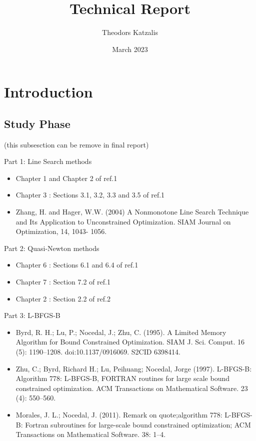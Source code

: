 \documentclass[a4paper,11pt]{article}
\title{Technical Report}
\author{Theodors Katzalis}
\date{March 2023}
\numberwithin{equation}{section} %
\begin{document}
\maketitle

\tableofcontents
\newpage

\section{Introduction}
\label{intro}

\subsection{Study Phase} (this subsesction can be remove in final report)

Part 1: Line Search methods

\begin{itemize}
\item Chapter 1 and Chapter 2 of ref.1
\item Chapter 3 : Sections 3.1, 3.2, 3.3 and 3.5 of ref.1
\item Zhang, H. and Hager, W.W. (2004) A Nonmonotone Line Search Technique and Its Application to Unconstrained Optimization. SIAM Journal on Optimization, 14, 1043-
1056.
\end{itemize}

Part 2: Quasi-Newton methods
\begin{itemize}
\item Chapter 6 : Sections 6.1 and 6.4 of ref.1
\item Chapter 7 : Section 7.2 of ref.1
\item Chapter 2 : Section 2.2 of ref.2
\end{itemize}

Part 3: L-BFGS-B
\begin{itemize}

\item Byrd, R. H.; Lu, P.; Nocedal, J.; Zhu, C. (1995). A Limited Memory Algorithm for
Bound Constrained Optimization. SIAM J. Sci. Comput. 16 (5): 1190–1208.
doi:10.1137/0916069. S2CID 6398414.

\item Zhu, C.; Byrd, Richard H.; Lu, Peihuang; Nocedal, Jorge (1997). L-BFGS-B: Algorithm 778: L-BFGS-B, FORTRAN routines for large scale bound constrained optimization. ACM Transactions on Mathematical Software. 23 (4): 550–560.

\item Morales, J. L.; Nocedal, J. (2011). Remark on quote;algorithm 778: L-BFGS-B: 
Fortran subroutines for large-scale bound constrained optimization; ACM Transactions on Mathematical Software. 38: 1–4.

\end{itemize}
\end{document}
